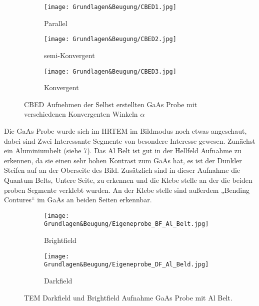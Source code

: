 \begin{figure}
     \centering
     \begin{subfigure}[b]{0.3\textwidth}
         \centering
         \texttt{[image: Grundlagen\&Beugung/CBED1.jpg]}
         \caption{Parallel}
         \label{CBEDP}
     \end{subfigure}
     \hfill
     \begin{subfigure}[b]{0.3\textwidth}
         \centering
         \texttt{[image: Grundlagen\&Beugung/CBED2.jpg]}
         \caption{semi-Konvergent}
         \label{CBEDSK}
     \end{subfigure}
     \hfill
     \begin{subfigure}[b]{0.3\textwidth}
         \centering
         \texttt{[image: Grundlagen\&Beugung/CBED3.jpg]}
         \caption{Konvergent}
         \label{CBEDK}
     \end{subfigure}
        \caption{CBED Aufnehmen der Selbst erstellten GaAs Probe mit verschiedenen Konvergenten Winkeln \(\alpha\)}
        \label{CBED}
\end{figure}

Die GaAs Probe wurde sich im HRTEM im Bildmodus noch etwas angeschaut, dabei sind Zwei Interessante Segmente von besondere Interesse gewesen. 
Zunächst ein Aluminiumbelt (siehe \cref{EPBF&DFAl}). Das Al Belt ist gut in der Hellfeld Aufnahme zu erkennen, da sie einen sehr hohen Kontrast zum GaAs hat, es ist der Dunkler Steifen auf an der Oberseite des Bild. Zusätzlich sind in dieser Aufnahme die Quantum Belts, Untere Seite, zu erkennen und die Klebe stelle an der die beiden proben Segmente verklebt wurden. An der Klebe stelle sind außerdem „Bending Contures“ im GaAs an beiden Seiten erkennbar.

\begin{figure}
     \centering
     \begin{subfigure}[b]{0.49\textwidth}
         \centering
         \texttt{[image: Grundlagen\&Beugung/Eigeneprobe\_BF\_Al\_Belt.jpg]}
         \caption{Brightfield}
         \label{EPBFAl}
     \end{subfigure}
     \hfill
     \begin{subfigure}[b]{0.49\textwidth}
         \centering
         \texttt{[image: Grundlagen\&Beugung/Eigeneprobe\_DF\_Al\_Beld.jpg]}
         \caption{Darkfield}
         \label{EPDFAl}
     \end{subfigure}
        \caption{TEM Darkfield und Brightfield Aufnahme GaAs Probe mit Al Belt.}
        \label{EPBF&DFAl}
\end{figure}

